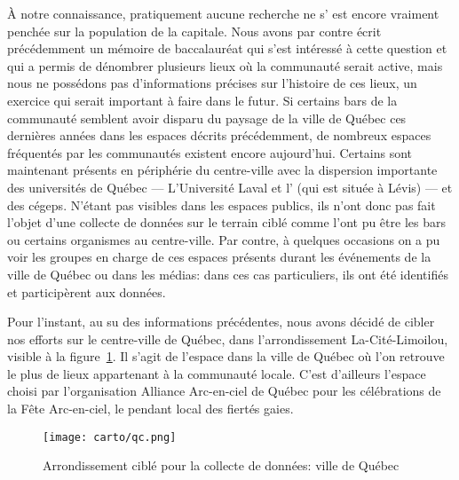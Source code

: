 À notre connaissance, pratiquement aucune recherche ne s’ est encore vraiment penchée sur la population \lgbt{} de la capitale. 
Nous avons par contre écrit précédemment un mémoire de baccalauréat qui s'est intéressé à cette question et qui a permis de dénombrer plusieurs lieux où la communauté serait active, mais nous ne possédons pas d'informations précises sur l'histoire de ces lieux, un exercice qui serait important à faire dans le futur. 
Si certains bars de la communauté semblent avoir disparu du paysage de la ville de Québec ces dernières années dans les espaces décrits précédemment, de nombreux espaces fréquentés par les communautés \lgbt{} existent encore aujourd'hui. 
Certains sont maintenant présents en périphérie du centre-ville avec la dispersion importante des universités de Québec --- L'Université Laval et l'\uqar{} (qui est située à Lévis) --- et des cégeps. 
N'étant pas visibles dans les espaces publics, ils n'ont donc pas fait l'objet d'une collecte de données sur le terrain ciblé comme l'ont pu être les bars ou certains organismes au centre-ville.
Par contre, à quelques occasions on a pu voir les groupes en charge de ces espaces présents durant les événements \lgbt{} de la ville de Québec ou dans les médias: dans ces cas particuliers, ils ont été identifiés et participèrent aux données.

Pour l'instant, au su des informations précédentes, nous avons décidé de cibler nos efforts sur le centre-ville de Québec, dans l'arrondissement La-Cité-Limoilou, visible à la figure~\ref{fig:espaces_quebec}. 
Il s'agit de l'espace dans la ville de Québec où l'on retrouve le plus de lieux appartenant à la communauté \lgbt{} locale. 
C'est d'ailleurs l'espace choisi par l'organisation Alliance Arc-en-ciel de Québec pour les célébrations de la Fête Arc-en-ciel, le pendant local des fiertés gaies.

\label{ssub:la_ville_de_quebec}
\begin{figure}[ht]
	\centering
	\texttt{[image: carto/qc.png]}
	\caption{Arrondissement ciblé pour la collecte de données: ville de Québec}\label{fig:espaces_quebec}
\end{figure}


